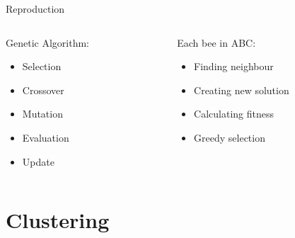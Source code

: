 \documentclass[14pt,ignorenonframetext,compress]{beamer}
\begin{document}
\begin{frame}{Reproduction}
\protect\hypertarget{reproduction}{}

\begin{columns}
\begin{column}{0.48\textwidth}

Genetic Algorithm:
\begin{itemize}
\item Selection
\item Crossover
\item Mutation
\item Evaluation
\item Update
\end{itemize}
\end{column}
\begin{column}{0.48\textwidth}

\pause

Each bee in ABC:
\begin{itemize}
\item Finding neighbour
\item Creating new solution
\item Calculating fitness
\item Greedy selection
\end{itemize}

\end{column}
\end{columns}

\end{frame}

\hypertarget{clustering}{%
\section{Clustering}\label{clustering}}
\end{document}
